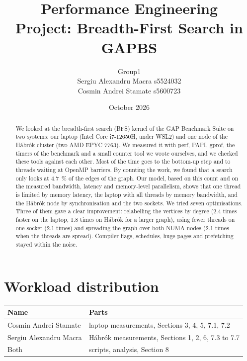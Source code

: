 \documentclass[11pt,a4paper]{article}
\title{Performance Engineering\\Project: Breadth-First Search in GAPBS}
\author{Group1\\Sergiu Alexandru Macra s5524032\\Cosmin Andrei Stamate s5600723}
\date{October 2026}
\begin{document}
\maketitle

\begin{abstract}
\noindent We looked at the breadth-first search (BFS) kernel of the GAP Benchmark Suite on
two systems: our laptop (Intel Core i7-12650H, under WSL2) and one node of the Hábrók
cluster (two AMD EPYC 7763). We measured it with perf, PAPI, gprof, the timers of the
benchmark and a small counter tool we wrote ourselves, and we checked these tools against
each other. Most of the time goes to the bottom-up step and to threads waiting at OpenMP
barriers. By counting the work, we found that a search only looks at \SI{4.7}{\percent} of
the edges of the graph. Our model, based on this count and on the measured bandwidth,
latency and memory-level parallelism, shows that one thread is limited by memory latency,
the laptop with all threads by memory bandwidth, and the Hábrók node by synchronisation and
the two sockets. We tried seven optimisations. Three of them gave a clear improvement:
relabelling the vertices by degree (2.4 times faster on the laptop, 1.8 times on Hábrók for
a larger graph), using fewer threads on one socket (2.1 times) and spreading the graph over
both NUMA nodes (2.1 times when the threads are spread). Compiler flags, schedules, huge pages and prefetching stayed within the noise.
\end{abstract}










\section{Workload distribution}
\begin{center}
\begin{tabular}{|l|l|}
\hline
Name & Parts \\
\hline
Cosmin Andrei Stamate & laptop measurements, Sections 3, 4, 5, 7.1, 7.2 \\
Sergiu Alexandru Macra & Hábrók measurements, Sections 1, 2, 6, 7.3 to 7.7 \\
Both & scripts, analysis, Section 8 \\
\hline
\end{tabular}
\end{center}
\end{document}
